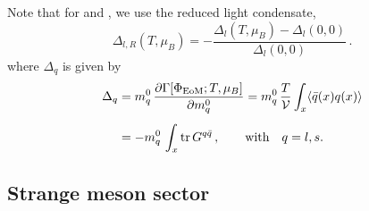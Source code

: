 \documentclass[10pt,prd,superscriptaddress,twocolumn]{revtex4-2}
\begin{document}
Note that for  and , we use the reduced light condensate,
%
\begin{equation}
	\Delta_{l,R}(T,\mu_B) = - \frac{\Delta_{l}(T,\mu_B) - \Delta_{l}(0,0)}{\Delta_l(0,0)}
	\,.
\end{equation}
%
where $\Delta_q$ is given by
%
\begin{align}
	\Delta_{q} &= m_q^0\,\frac{\partial \Gamma[\Phi_\textrm{EoM};T,\mu_B]}{\partial m^0_q}
	= m_q^0\,\frac{T}{\mathcal{V}}\int_x \langle \bar q(x) q(x) \rangle
	\notag\\[1ex]
	&=-m_q^0\,\int_x \text{tr}\,G^{q\bar{q}}
	\,,\qquad\text{with}\quad q=l,s.
    \label{eq:Delta}
\end{align}
%



\subsection{Strange meson sector}
\label{sec:QCDPD_setup_strange}
\end{document}
